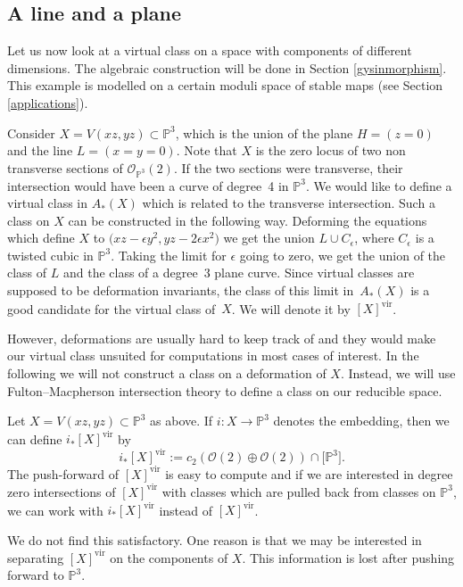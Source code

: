 \documentclass[pdftex]{sigma}
\numberwithin{equation}{section}
\newcommand{\vv}{\mathrm{vir}}
\newcommand{\OO}{\mathcal{O}}
\newcommand{\PP}{\mathbb P}
\theoremstyle{plain}
\theoremstyle{definition}
\theoremstyle{remark}
\begin{document}
\subsection{A line and a plane}\label{section:line-plane}
Let us now look at a virtual class on a space with components of different dimensions. The algebraic construction will be done in Section \ref{gysinmorphism}. This example is modelled on a certain moduli space of stable maps (see Section \ref{applications}).

Consider $X=V(xz,yz)\subset\PP^3$, which is the union of the plane $H=(z=0)$ and the line $L=(x=y=0)$. Note that $X$ is the zero locus of two non transverse sections of $\OO_{\PP^3}(2)$. If the two sections were transverse, their intersection would have been a curve of degree~4 in $\PP^3$. We would like to define a virtual class in $A_*(X)$ which is related to the transverse intersection. Such a class on $X$ can be constructed in the following way. Deforming the equations which define $X$ to $\big(xz-\epsilon y^2,yz-2\epsilon x^2\big)$ we get the union $L\cup C_{\epsilon}$, where $C_{\epsilon}$ is a twisted cubic in $\mathbb P^3$. Taking the limit for $\epsilon$ going to zero, we get the union of the class of $L$ and the class of a degree~3 plane curve. Since virtual classes are supposed to be deformation invariants, the class of this limit in~$A_*(X)$ is a good candidate for the virtual class of~$X$. We will denote it by $[X]^{\vv}$.

However, deformations are usually hard to keep track of and they would make our virtual class unsuited for computations in most cases of interest. In the following we will not construct a class on a deformation of $X$. Instead, we will use Fulton--Macpherson intersection theory to define a class on our reducible space.

\begin{Remark} Let $X=V(xz,yz)\subset\PP^3$ as above. If $i:X\to\PP^3$ denotes the embedding, then we can define $i_*[X]^{\vv}$ by
\[
i_*[X]^{\vv}:=c_2(\mathcal{O}(2)\oplus \mathcal{O}(2))\cap\big[\PP^3\big].
\]
The push-forward of $[X]^{\vv}$ is easy to compute and if we are interested in degree zero intersections of $[X]^{\vv}$ with classes which are pulled back from classes on $\PP^3$, we can work with $i_*[X]^{\vv}$ instead of $[X]^{\vv}$.

We do not find this satisfactory. One reason is that we may be interested in separating $[X]^{\vv}$ on the components of $X$. This information is lost after pushing forward to $\PP^3$.
\end{Remark}
\end{document}

